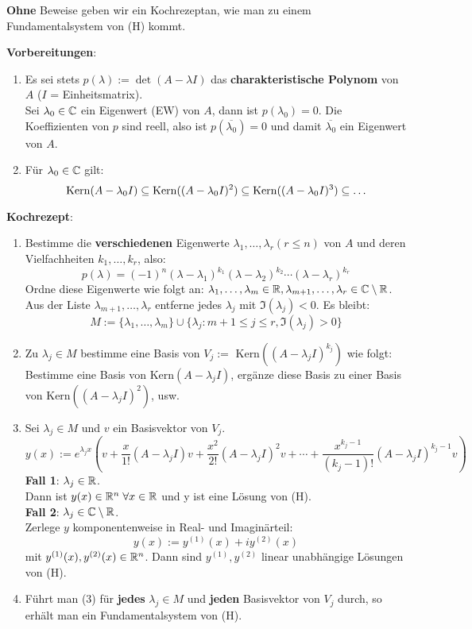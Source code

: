 \documentclass[a4paper,twoside,DIV15,BCOR12mm,chapterprefix=true,headings=twolinechapter]{scrbook}
\begin{document}
\textbf{Ohne} Beweise geben wir ein \glqq Kochrezept\grqq an, wie man zu einem Fundamentalsystem von (H) kommt.

\textbf{Vorbereitungen}: 
\begin{enumerate}
\item Es sei stets $p(\lambda) := \det(A - \lambda I)$ das \textbf{charakteristische Polynom}
von $A$ ($I$ = Einheitsmatrix). \\
Sei $\lambda_0 \in \mathbb{C}$ ein Eigenwert (EW) von $A$, dann 
ist $p(\lambda_0) = 0$. Die Koeffizienten von $p$ sind reell, also ist $p(\overline{\lambda_0}) = 0$
und damit $\overline{\lambda_0}$ ein Eigenwert von $A$.
\item Für $\lambda_0 \in \mathbb{C}$ gilt: 
\[\mathop{\rm Kern}\nolimits(A-\lambda_0 I) \subseteq \mathop{\rm Kern}\nolimits((A-\lambda_0 I)^2) \subseteq \mathop{\rm Kern}\nolimits((A-\lambda_0 I)^3) \subseteq \ldots\]
\end{enumerate} 

\textbf{Kochrezept}:
\begin{enumerate}
\item Bestimme die \textbf{verschiedenen} Eigenwerte $\lambda_1, \ldots, \lambda_r (r \le n)$ 
von $A$ und deren Vielfachheiten $k_1, \ldots, k_r$, also: 
\[p(\lambda) = (-1)^n (\lambda - \lambda_1)^{k_1} (\lambda - \lambda_2)^{k_2} \cdots (\lambda - \lambda_r)^{k_r}\] 
Ordne diese Eigenwerte wie folgt an: $\lambda_1, \ldots, \lambda_m \in \mathbb{R}, \lambda_{m+1}, \ldots, \lambda_r \in \mathbb{C} \setminus \mathbb{R}$.\\ 
Aus der Liste $\lambda_{m+1}, \ldots, \lambda_r$ entferne jedes $\lambda_j$ mit 
$\Im(\lambda_j) < 0$. Es bleibt: 
\[M := \{\lambda_1, \ldots, \lambda_m\} \cup \{\lambda_j : m + 1 \le j \le r, \Im(\lambda_j) > 0 \}\]

\item Zu $\lambda_j \in M$ bestimme eine Basis von $V_j := $ Kern$((A-\lambda_j I)^{k_j})$ 
wie folgt: Bestimme eine Basis von Kern$(A-\lambda_j I)$, ergänze diese Basis zu 
einer Basis von Kern$((A-\lambda_j I)^2)$, usw.

\item Sei $\lambda_j \in M$ und $v$ ein Basisvektor von $V_j$. \\
\[y(x) := e^{\lambda_j x} (v+\frac{x}{1!} (A-\lambda_j I)v + \frac{x^2}{2!} (A-\lambda_j I)^2 v + \cdots + \frac{x^{k_j - 1}}{ (k_j - 1)! } (A - \lambda_j I)^{k_j - 1} v )\]
\textbf{Fall 1}: $\lambda_j \in \mathbb{R}$.\\
Dann ist $y(x) \in \mathbb{R}^n \; \forall x \in \mathbb{R}$ und y ist eine Lösung von (H). \\
\textbf{Fall 2}: $\lambda_j \in \mathbb{C} \setminus \mathbb{R}$.\\
Zerlege $y$ komponentenweise in Real- und Imaginärteil: 
\[y(x) := y^{(1)}(x) + i y^{(2)}(x)\]
mit $y^{(1)}(x),y^{(2)}(x)\in\mathbb{R}^n$. Dann sind $y^{(1)}, y^{(2)}$ linear unabhängige Lösungen von (H).

\item Führt man (3) für \textbf{jedes} $\lambda_j \in M$ und \textbf{jeden} Basisvektor von $V_j$ durch, so erhält man ein Fundamentalsystem von (H).
\end{enumerate}
\end{document}
